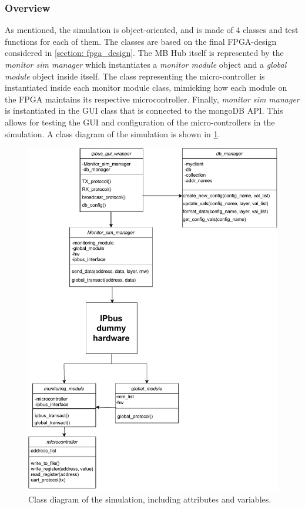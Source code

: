 \documentclass[main.tex]{subfiles}
\begin{document}
\subsubsection{Overview}
As mentioned, the simulation is object-oriented, and is made of 4 classes and test functions for each of them. The classes are based on the final FPGA-design considered in \autoref{section: fpga_design}. The MB Hub itself is represented by the \textit{monitor sim manager} which instantiates a \textit{monitor module} object and a \textit{global module} object inside itself. The class representing the micro-controller is instantiated inside each monitor module class, mimicking how each module on the FPGA maintains its respective microcontroller. Finally, \textit{monitor sim manager} is instantiated in the GUI class that is connected to the mongoDB API. This allows for testing the GUI and configuration of the micro-controllers in the simulation. A class diagram of the simulation is shown in \ref{fig: class_diagram}.

\begin{figure}[!ht]
    \centering
    \includegraphics[width=14cm]{images/class chart.pdf}
    \caption{Class diagram of the simulation, including attributes and variables.}
    \label{fig: class_diagram}
\end{figure}
\FloatBarrier
\end{document}
